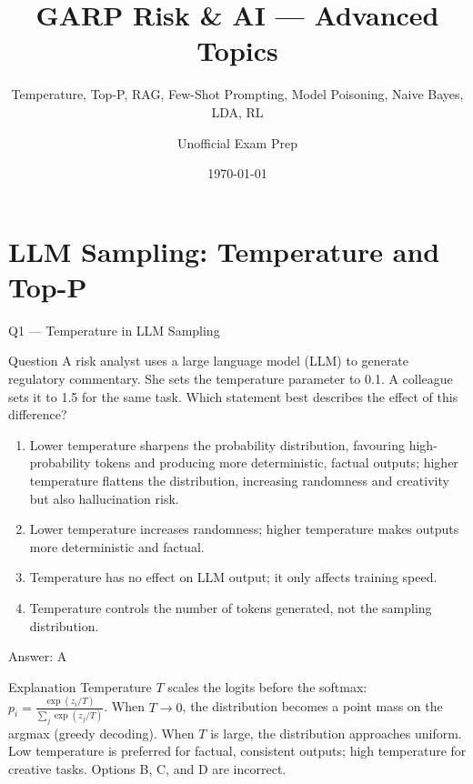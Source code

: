 \documentclass[aspectratio=169,8pt]{beamer}
\title[GARP RAI]{GARP Risk \& AI --- Advanced Topics}
\subtitle{Temperature, Top-P, RAG, Few-Shot Prompting, Model Poisoning, Naive Bayes, LDA, RL}
\author{Unofficial Exam Prep}
\date{\today}
\begin{document}
	
	\begin{frame}
		\titlepage
	\end{frame}
	
	\section{LLM Sampling: Temperature and Top-P}
	
	\begin{frame}{Q1 --- Temperature in LLM Sampling}
		\begin{block}{Question}
			A risk analyst uses a large language model (LLM) to generate regulatory commentary. She sets the temperature parameter to 0.1. A colleague sets it to 1.5 for the same task. Which statement best describes the effect of this difference?
			\begin{enumerate}
				\item Lower temperature sharpens the probability distribution, favouring high-probability tokens and producing more deterministic, factual outputs; higher temperature flattens the distribution, increasing randomness and creativity but also hallucination risk.
				\item Lower temperature increases randomness; higher temperature makes outputs more deterministic and factual.
				\item Temperature has no effect on LLM output; it only affects training speed.
				\item Temperature controls the number of tokens generated, not the sampling distribution.
			\end{enumerate}
		\end{block}
		\begin{exampleblock}{Answer: A}\end{exampleblock}
		\begin{block}{Explanation}
			Temperature $T$ scales the logits before the softmax: $p_i = \frac{\exp(z_i/T)}{\sum_j \exp(z_j/T)}$. When $T \to 0$, the distribution becomes a point mass on the argmax (greedy decoding). When $T$ is large, the distribution approaches uniform. Low temperature is preferred for factual, consistent outputs; high temperature for creative tasks. Options B, C, and D are incorrect.
		\end{block}
	\end{frame}
	
\end{document}
